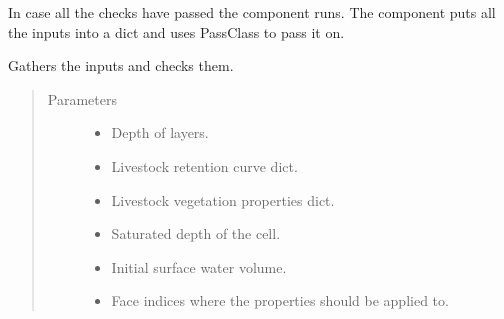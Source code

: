 \documentclass[letterpaper,10pt,english]{sphinxmanual}
\begin{document}
\begin{fulllineitems}
\begin{fulllineitems}
\begin{quote}
\begin{description}
\end{description}\end{quote}

\end{fulllineitems}


\begin{fulllineitems}
\label{\detokenize{cmf:livestock.components.comp_cmf.CMFGround.run}}
In case all the checks have passed the component runs.
The component puts all the inputs into a dict and uses PassClass to pass it on.

\end{fulllineitems}


\begin{fulllineitems}
\label{\detokenize{cmf:livestock.components.comp_cmf.CMFGround.run_checks}}
Gathers the inputs and checks them.
\begin{quote}\begin{description}
\item[{Parameters}] \leavevmode\begin{itemize}
\item {} 
 \textendash{} Depth of layers.

\item {} 
 \textendash{} Livestock retention curve dict.

\item {} 
 \textendash{} Livestock vegetation properties dict.

\item {} 
 \textendash{} Saturated depth of the cell.

\item {} 
 \textendash{} Initial surface water volume.

\item {} 
 \textendash{} Face indices where the properties should be applied to.


\end{itemize}
\end{description}
\end{quote}
\end{fulllineitems}
\end{fulllineitems}
\end{document}
